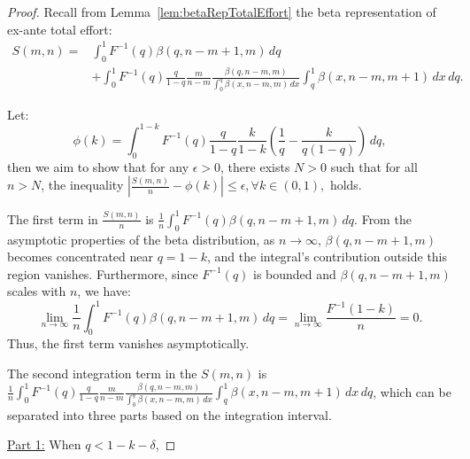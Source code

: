\begin{proof}
    Recall from Lemma~\ref{lem:betaRepTotalEffort} the beta representation of ex-ante total effort:
    \[
    \begin{aligned}
        S(m,n) = & 
        \int_0^1F^{-1}(q)\beta(q,n-m+1,m)\,dq \\
        & +\int_0^1F^{-1}(q)\frac{q}{1-q} \frac{m}{n-m}\frac{\beta(q,n-m,m)}{\int_0^q\beta(x,n-m,m)\,dx}\int_q^1\beta(x,n-m,m+1)\,dx\, dq.
    \end{aligned}
    \]

    Let:
    \[
    \phi(k) = \int_0^{1-k} F^{-1}(q) \frac{q}{1-q} \frac{k}{1-k} \left( \frac{1}{q} - \frac{k}{q(1-q)} \right) \, dq,
    \]then we aim to show that for any \(\epsilon > 0\), there exists \(N > 0\) such that for all \(n > N\), the inequality \(
\left| \frac{S(m,n)}{n} - \phi(k) \right| \leq \epsilon, \forall k \in (0,1), \) holds.


    The first term in \(\frac{S(m,n)}{n}\) is \(\frac{1}{n} \int_0^1 F^{-1}(q) \beta(q, n-m+1, m) \, dq. \) From the asymptotic properties of the beta distribution, as \(n \to \infty\), \(\beta(q, n-m+1, m)\) becomes concentrated near \(q = 1-k\), and the integral's contribution outside this region vanishes. Furthermore, since \(F^{-1}(q)\) is bounded and \(\beta(q, n-m+1, m)\) scales with \(n\), we have:
\[
\lim_{n \to \infty} \frac{1}{n} \int_0^1 F^{-1}(q) \beta(q, n-m+1, m) \, dq = \lim_{n \to \infty} \frac{F^{-1}(1-k)}{n} = 0.
\]
Thus, the first term vanishes asymptotically.

    The second integration term in the $S(m,n)$ is $\frac{1}{n}\int_0^1F^{-1}(q)\frac{q}{1-q} \frac{m}{n-m}\frac{\beta(q,n-m,m)}{\int_0^q\beta(x,n-m,m)\,dx}\int_q^1\beta(x,n-m,m+1)\,dx\, dq$, which can be separated into three parts based on the integration interval.

    \underline{Part 1:} When $q<1-k-\delta$,


\end{proof}
